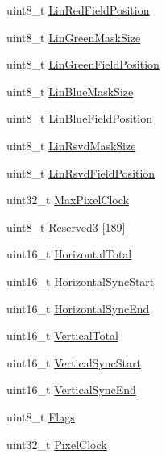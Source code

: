 \begin{DoxyCompactItemize}
uint8\+\_\+t \mbox{\hyperlink{structRTEMS__PACKED_aacf8720cf343d167172b5ed59f0be7bb}{Lin\+Red\+Field\+Position}}
\item 
uint8\+\_\+t \mbox{\hyperlink{structRTEMS__PACKED_ae2b0f84b447c59d93ff030c25a50c064}{Lin\+Green\+Mask\+Size}}
\item 
uint8\+\_\+t \mbox{\hyperlink{structRTEMS__PACKED_ae79259d1a968be28dcf9461d19bf2e6e}{Lin\+Green\+Field\+Position}}
\item 
uint8\+\_\+t \mbox{\hyperlink{structRTEMS__PACKED_a1d4e0c5c2e6dead2dbf55fc7c1e64f2a}{Lin\+Blue\+Mask\+Size}}
\item 
uint8\+\_\+t \mbox{\hyperlink{structRTEMS__PACKED_ad34bba19366f5fd37bdd217452472ec5}{Lin\+Blue\+Field\+Position}}
\item 
uint8\+\_\+t \mbox{\hyperlink{structRTEMS__PACKED_a949080684299abee7ef6fdf7bdabc97d}{Lin\+Rsvd\+Mask\+Size}}
\item 
uint8\+\_\+t \mbox{\hyperlink{structRTEMS__PACKED_a9f38fd8a8c1c5cb274d6fab291d52fe1}{Lin\+Rsvd\+Field\+Position}}
\item 
uint32\+\_\+t \mbox{\hyperlink{structRTEMS__PACKED_a5895088647fca7623051b09f3bec611e}{Max\+Pixel\+Clock}}
\item 
uint8\+\_\+t \mbox{\hyperlink{structRTEMS__PACKED_a119eb9019560e8f6143b097c92fbd437}{Reserved3}} \mbox{[}189\mbox{]}
\item 
uint16\+\_\+t \mbox{\hyperlink{structRTEMS__PACKED_ae9261a640295a5f5b7be811babc19a79}{Horizontal\+Total}}
\item 
uint16\+\_\+t \mbox{\hyperlink{structRTEMS__PACKED_a1eb8404729f2f6bba07becd2e35b3173}{Horizontal\+Sync\+Start}}
\item 
uint16\+\_\+t \mbox{\hyperlink{structRTEMS__PACKED_a18430edd1dbb6eb7515fee75254d0a1f}{Horizontal\+Sync\+End}}
\item 
uint16\+\_\+t \mbox{\hyperlink{structRTEMS__PACKED_a778d367b78e8831e867c5f67ac38fd0f}{Vertical\+Total}}
\item 
uint16\+\_\+t \mbox{\hyperlink{structRTEMS__PACKED_a75512cae5d00fb36da0f2c4a4af31025}{Vertical\+Sync\+Start}}
\item 
uint16\+\_\+t \mbox{\hyperlink{structRTEMS__PACKED_a3a943a966b235ebf99586162ce7bf7ab}{Vertical\+Sync\+End}}
\item 
uint8\+\_\+t \mbox{\hyperlink{structRTEMS__PACKED_ab0ef736918f22c8cb8967b6cec4d2c89}{Flags}}
\item 
uint32\+\_\+t \mbox{\hyperlink{structRTEMS__PACKED_a266a263734f55d7e97c4e874d57d8e66}{Pixel\+Clock}}

\end{DoxyCompactItemize}
